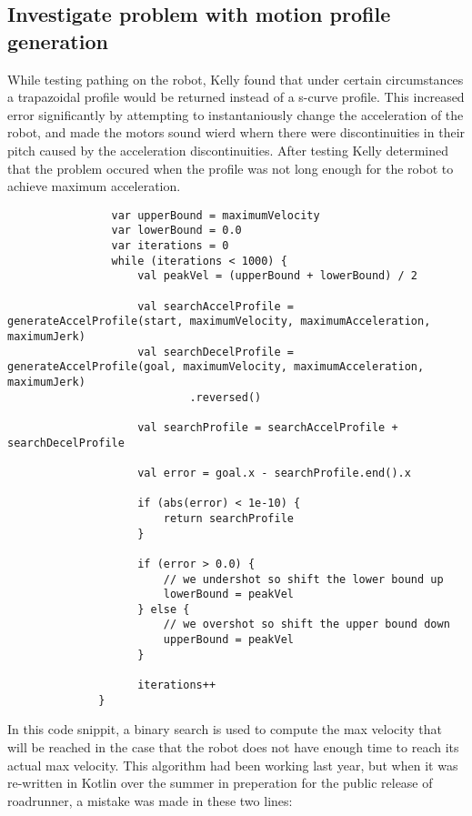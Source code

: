 \documentclass{article}
\newif\ifcontents
\begin{document}
\contentsfalse

\subsection{Investigate problem with motion profile generation}
While testing pathing on the robot, Kelly found that under certain circumstances a trapazoidal profile would be returned instead of a s-curve profile. This increased error significantly by attempting to instantaniously change the acceleration of the robot, and made the motors sound wierd whern there were discontinuities in their pitch caused by the acceleration discontinuities. After testing Kelly determined that the problem occured when the profile was not long enough for the robot to achieve maximum acceleration. 


\begin{lstlisting}
                var upperBound = maximumVelocity
                var lowerBound = 0.0
                var iterations = 0
                while (iterations < 1000) {
                    val peakVel = (upperBound + lowerBound) / 2

                    val searchAccelProfile = generateAccelProfile(start, maximumVelocity, maximumAcceleration, maximumJerk)
                    val searchDecelProfile = generateAccelProfile(goal, maximumVelocity, maximumAcceleration, maximumJerk)
                            .reversed()

                    val searchProfile = searchAccelProfile + searchDecelProfile

                    val error = goal.x - searchProfile.end().x

                    if (abs(error) < 1e-10) {
                        return searchProfile
                    }

                    if (error > 0.0) {
                        // we undershot so shift the lower bound up
                        lowerBound = peakVel
                    } else {
                        // we overshot so shift the upper bound down
                        upperBound = peakVel
                    }

                    iterations++
              }

\end{lstlisting}

In this code snippit, a binary search is used to compute the max velocity that will be reached in the case that the robot does not have enough time to reach its actual max velocity. This algorithm had been working last year, but when it was re-written in Kotlin over the summer in preperation for the public release of roadrunner, a mistake was made in these two lines:
\end{document}

